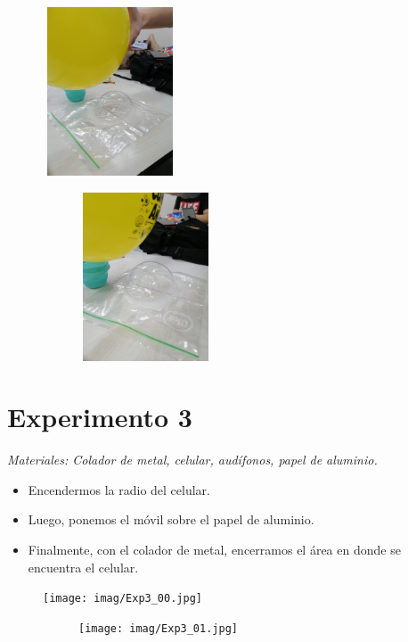 \documentclass[a4paper,12pt]{article}
\begin{document}
\begin{figure}[h!]
    \begin{subfigure}
        \raggedright
        \includegraphics[width=4cm, height=5cm]{imag/Exp2_03.jpg}
    \end{subfigure}
    \begin{subfigure}
        \centering
        \includegraphics[width=4cm, height=5cm]{imag/Exp2_04.jpg}
    \end{subfigure}
\end{figure}
\newpage
\section*{Experimento 3}
\textit{Materiales: Colador de metal, celular, audífonos, papel de aluminio.}
    \begin{itemize}
        \item Encendermos la radio del celular.
        \item Luego, ponemos el móvil sobre el papel de aluminio.
        \item Finalmente, con el colador de metal, encerramos el área en donde se encuentra el celular.
    \end{itemize}

\begin{figure}[h!]
    \begin{subfigure}
        \raggedright
        \texttt{[image: imag/Exp3\_00.jpg]}
    \end{subfigure}
    \begin{subfigure}
        \centering
        \texttt{[image: imag/Exp3\_01.jpg]}
    \end{subfigure}
\end{figure}
\end{document}
